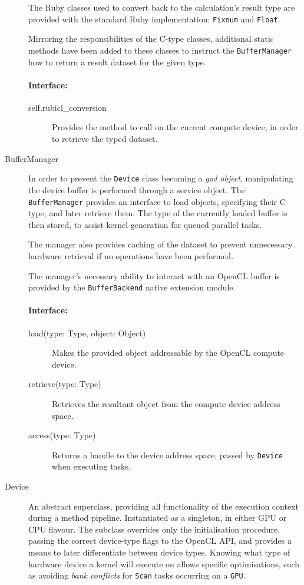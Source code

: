 \begin{description}
The Ruby classes used to convert back to the calculation's result type are provided with the standard Ruby implementation: \verb|Fixnum| and \verb|Float|.

Mirroring the responsibilities of the C-type classes, additional static methods have been added to these classes to instruct the \verb|BufferManager| how to return a result dataset for the given type.
\paragraph*{Interface:}
\begin{description}
  \item[self.rubicl\_conversion] Provides the method to call on the current compute device, in order to retrieve the typed dataset.
\end{description}

  \item[BufferManager]
In order to prevent the \verb|Device| class becoming a \emph{god object}, manipulating the device buffer is performed through a service object. The \verb|BufferManager| provides an interface to load objects, specifying their C-type, and later retrieve them. The type of the currently loaded buffer is then stored, to assist kernel generation for queued parallel tasks.

The manager also provides caching of the dataset to prevent unnecessary hardware retrieval if no operations have been performed.

The manager's necessary ability to interact with an \ac{OpenCL} buffer is provided by the \verb|BufferBackend| native extension module.
\paragraph*{Interface:}
\begin{description}
  \item[load(type: Type, object: Object)] Makes the provided object addressable by the \ac{OpenCL} compute device.

  \item[retrieve(type: Type)] Retrieves the resultant object from the compute device address space.

  \item[access(type: Type)] Returns a handle to the device address space, passed by \verb|Device| when executing tasks.
\end{description}

\item[Device]
  An abstract superclass, providing all functionality of the execution context during a method pipeline. Instantiated as a singleton, in either \ac{GPU} or \ac{CPU} flavour. The subclass overrides only the initialisation procedure, passing the correct device-type flags to the \ac{OpenCL} \ac{API}, and provides a means to later differentiate between device types. Knowing what type of hardware device a kernel will execute on allows specific optimisations, such as avoiding \emph{bank conflicts} for \verb|Scan| tasks occurring on a \verb|GPU|.

\end{description}

